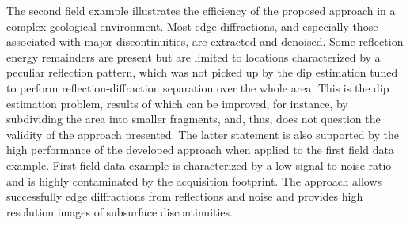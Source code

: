
The second field example illustrates the efficiency of the proposed approach in a complex geological environment.
Most edge diffractions, and especially those associated with major discontinuities, are extracted and denoised. 
Some reflection energy remainders are present but are limited to locations characterized by a peculiar reflection pattern,
which was not picked up by the dip estimation tuned to perform reflection-diffraction separation over the whole area.
This is the dip estimation problem, results of which can be improved, for instance, by subdividing the area into smaller fragments, and, thus,
does not question the validity of the approach presented. The latter statement is also supported by the high performance of the developed approach when applied to the first field data example. First field data example is characterized by a low signal-to-noise ratio and is highly contaminated by the acquisition footprint. The approach
allows successfully  edge diffractions from reflections and noise and provides high resolution images of subsurface discontinuities. 


